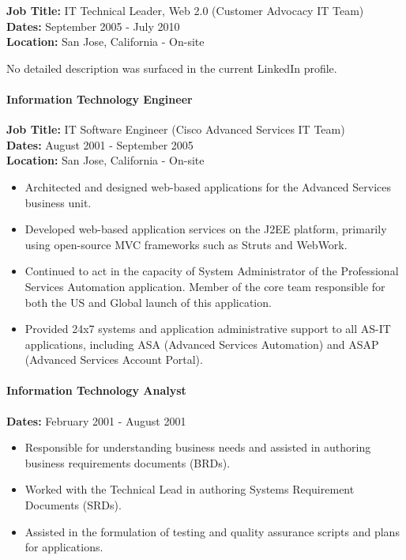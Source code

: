 \documentclass[
]{article}
\providecommand{\tightlist}{%
  \setlength{\itemsep}{0pt}\setlength{\parskip}{0pt}}
\renewcommand{\tightlist}{%
  \setlength{\itemsep}{0.12em}\setlength{\parskip}{0pt}\setlength{\parsep}{0pt}%
}
\begin{document}
\textbf{Job Title:} IT Technical Leader, Web 2.0 (Customer Advocacy IT
Team)\\
\textbf{Dates:} September 2005 - July 2010\\
\textbf{Location:} San Jose, California - On-site

No detailed description was surfaced in the current LinkedIn profile.

\paragraph{Information Technology
Engineer}\label{information-technology-engineer}

\textbf{Job Title:} IT Software Engineer (Cisco Advanced Services IT
Team)\\
\textbf{Dates:} August 2001 - September 2005\\
\textbf{Location:} San Jose, California - On-site

\begin{itemize}
\tightlist
\item
  Architected and designed web-based applications for the Advanced
  Services business unit.
\item
  Developed web-based application services on the J2EE platform,
  primarily using open-source MVC frameworks such as Struts and WebWork.
\item
  Continued to act in the capacity of System Administrator of the
  Professional Services Automation application. Member of the core team
  responsible for both the US and Global launch of this application.
\item
  Provided 24x7 systems and application administrative support to all
  AS-IT applications, including ASA (Advanced Services Automation) and
  ASAP (Advanced Services Account Portal).
\end{itemize}

\paragraph{Information Technology
Analyst}\label{information-technology-analyst}

\textbf{Dates:} February 2001 - August 2001

\begin{itemize}
\tightlist
\item
  Responsible for understanding business needs and assisted in authoring
  business requirements documents (BRDs).
\item
  Worked with the Technical Lead in authoring Systems Requirement
  Documents (SRDs).
\item
  Assisted in the formulation of testing and quality assurance scripts
  and plans for applications.
\end{itemize}
\end{document}
